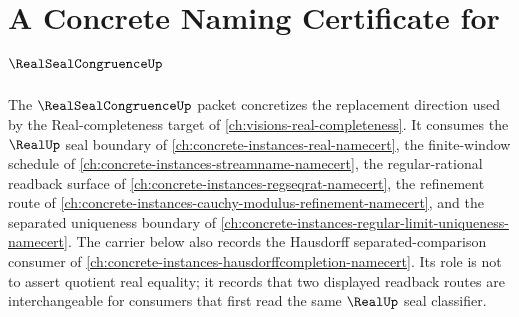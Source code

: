 \chapter{A Concrete Naming Certificate for $\RealSealCongruenceUp$}
\label{ch:concrete-instances-real-seal-congruence-namecert}

The $\RealSealCongruenceUp$ packet concretizes the replacement direction used by the Real-completeness target of \autoref{ch:visions-real-completeness}. It consumes the $\RealUp$ seal boundary of \autoref{ch:concrete-instances-real-namecert}, the finite-window schedule of \autoref{ch:concrete-instances-streamname-namecert}, the regular-rational readback surface of \autoref{ch:concrete-instances-regseqrat-namecert}, the refinement route of \autoref{ch:concrete-instances-cauchy-modulus-refinement-namecert}, and the separated uniqueness boundary of \autoref{ch:concrete-instances-regular-limit-uniqueness-namecert}. The carrier below also records the Hausdorff separated-comparison consumer of \autoref{ch:concrete-instances-hausdorffcompletion-namecert}. Its role is not to assert quotient real equality; it records that two displayed readback routes are interchangeable for consumers that first read the same $\RealUp$ seal classifier.



